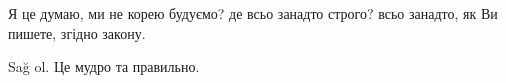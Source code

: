 \begin{itemize}
 
Я це думаю, ми не корею будуємо? де всьо занадто строго? всьо занадто, як Ви пишете, згідно закону.


Sağ ol. Це мудро та правильно.

\end{itemize}

